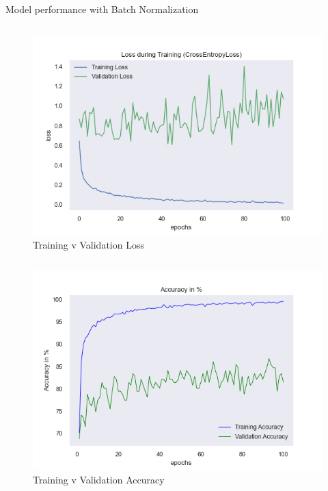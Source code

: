 \documentclass[aspectratio=169]{beamer}
\begin{document}
{    \begin{frame}{Model performance with Batch Normalization}
        \begin{column}{.5\textwidth}
            \begin{figure}
                \centering
                \includegraphics[width=1\textwidth]{img/baptiste_100epoches_val_loss__Dropouts_False__BatchNorm_True.png}
                \caption{Training v Validation Loss}
            \end{figure}
        \end{column}
        \begin{column}{.5\textwidth}
            \begin{figure}
                \centering
                \includegraphics[width=1\textwidth]{img/baptiste_100epoches_train_accuracy__Dropouts_False__BatchNorm_True.png}
                \caption{Training v Validation Accuracy}
            \end{figure}
        \end{column}
    \end{frame}

}
\end{document}
